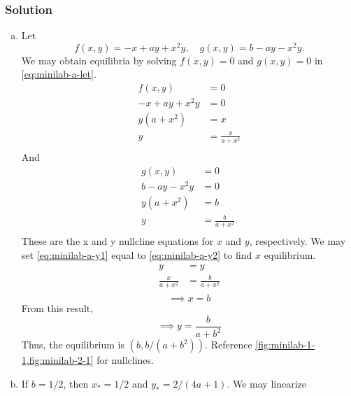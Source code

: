 \documentclass[12pt,twoside]{article}
\begin{document}
\subsubsection*{Solution}
\begin{enumerate}[(a)]
\item
  Let
  \begin{equation}
    \label{eq:minilab-a-let}
    f(x,y)=-x+ay+x^2y,\quad g(x,y)=b-ay-x^2y.
  \end{equation}
  We may obtain equilibria by solving $f(x,y)=0$ and $g(x,y)=0$ in \cref{eq:minilab-a-let}.
  \begin{equation}
    \label{eq:minilab-a-y1}
    \begin{aligned}
      f(x,y) &= 0 \\
      -x+ay+x^2y &= 0 \\
      y(a+x^2) &= x \\
      y &= \frac{x}{a+x^2} \\
    \end{aligned}
  \end{equation}
  And
  \begin{equation}
    \label{eq:minilab-a-y2}
    \begin{aligned}
      g(x,y) &= 0 \\
      b-ay-x^2y &= 0 \\
      y(a+x^2) &= b \\
      y &= \frac{b}{a+x^2}. \\
    \end{aligned}
  \end{equation}
  These are the x and y nullcline equations for $x$ and $y$, respectively. We
  may set \cref{eq:minilab-a-y1} equal to \cref{eq:minilab-a-y2} to find $x$
  equilibrium.
  \begin{equation*}
    \begin{aligned}
      y &= y \\
      \frac{x}{a+x^2} &= \frac{b}{a+x^2} \\
    \end{aligned}
  \end{equation*}
  \begin{equation*}
    \implies x = b
  \end{equation*}
  From this result,
  \begin{equation*}
    \implies y = \frac{b}{a+b^2}
  \end{equation*}
  Thus, the equilibrium is $(b,b/(a+b^2))$. Reference
  \cref{fig:minilab-1-1,fig:minilab-2-1} for nullclines.
\item If $b=1/2$, then $x_*=1/2$ and $y_*=2/(4a+1)$. We may linearize

\end{enumerate}
\end{document}
